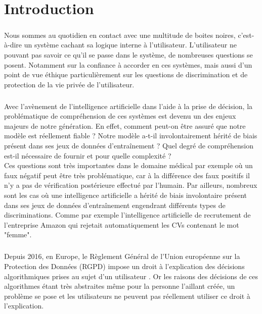 \chapter*{Introduction}
\label{chap:introduction}
\vspace{5mm}
\paragraph{}Nous sommes au quotidien en contact avec une multitude de boites noires, c’est-à-dire un système cachant sa logique interne à l’utilisateur. L’utilisateur ne pouvant pas savoir ce qu’il se passe dans le système, de nombreuses questions se posent. Notamment sur la confiance à accorder en ces systèmes, mais aussi d’un point de vue éthique particulièrement sur les questions de discrimination et de protection de la vie privée de l’utilisateur.

\paragraph{}Avec l’avènement de l’intelligence artificielle dans l’aide à la prise de décision, la problématique de compréhension de ces systèmes est devenu un des enjeux majeurs de notre génération. En effet, comment peut-on être assuré que notre modèle est réellement fiable ? Notre modèle a-t-il involontairement hérité de biais présent dans ses jeux de données d'entraînement ? Quel degré de compréhension est-il nécessaire de fournir et pour quelle complexité ?\\
Ces questions sont très importantes dans le domaine médical par exemple où un faux négatif peut être très problématique, car à la différence des faux positifs il n'y a pas de vérification postérieure effectué par l'humain. Par ailleurs, nombreux sont les cas où une intelligence artificielle a hérité de biais involontaire présent dans ses jeux de données d'entraînement engendrant différents types de discriminations. Comme par exemple l'intelligence artificielle de recrutement de l'entreprise Amazon qui rejetait automatiquement les CVs contenant le mot "femme"\cite{amazonAi}.

\paragraph{}Depuis 2016, en Europe, le Règlement Général de l'Union européenne sur la Protection des Données (RGPD) impose un droit à l'explication des décisions algorithmiques prises au sujet d'un utilisateur \cite{RGPDexplanRight}. Or les raisons des décisions de ces algorithmes étant très abstraites même pour la personne l'aillant créée, un problème se pose et les utilisateurs ne peuvent pas réellement utiliser ce droit à l'explication.

